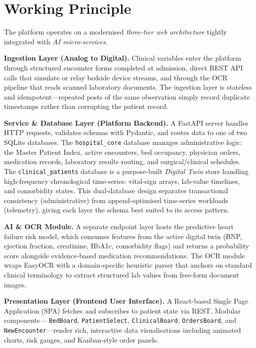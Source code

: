 \documentclass[12pt,a4paper]{article}
\begin{document}
\section{Working Principle}

The platform operates on a modernised \textit{three-tier web architecture} tightly
integrated with \textit{AI micro-services}.

\textbf{Ingestion Layer (Analog to Digital).}  Clinical variables enter the platform
through structured encounter forms completed at admission, direct REST API calls that
simulate or relay bedside device streams, and through the OCR pipeline that reads
scanned laboratory documents. The ingestion layer is stateless and idempotent—repeated
posts of the same observation simply record duplicate timestamps rather than corrupting
the patient record.

\textbf{Service \& Database Layer (Platform Backend).}  A FastAPI server handles HTTP
requests, validates schemas with Pydantic, and routes data to one of two SQLite
databases. The \texttt{hospital\_core} database manages administrative logic: the
Master Patient Index, active encounters, bed occupancy, physician orders, medication
records, laboratory results routing, and surgical/clinical schedules. The
\texttt{clinical\_patients} database is a purpose-built \textit{Digital Twin} store
handling high-frequency chronological time-series: vital-sign arrays, lab-value
timelines, and comorbidity states. This dual-database design separates transactional
consistency (administrative) from append-optimised time-series workloads (telemetry),
giving each layer the schema best suited to its access pattern.

\textbf{AI \& OCR Module.}  A separate endpoint layer hosts the predictive heart failure
risk model, which consumes features from the active digital twin (BNP, ejection fraction,
creatinine, HbA1c, comorbidity flags) and returns a probability score alongside
evidence-based medication recommendations. The OCR module wraps EasyOCR with a
domain-specific heuristic parser that anchors on standard clinical terminology to extract
structured lab values from free-form document images.

\textbf{Presentation Layer (Frontend User Interface).}  A React-based Single Page
Application (SPA) fetches and subscribes to patient state via REST.  Modular components—
\texttt{BedBoard}, \texttt{PatientSelect}, \texttt{ClinicalBoard}, \texttt{OrdersBoard},
and \texttt{NewEncounter}—render rich, interactive data visualisations including animated
charts, risk gauges, and Kanban-style order panels.
\end{document}

